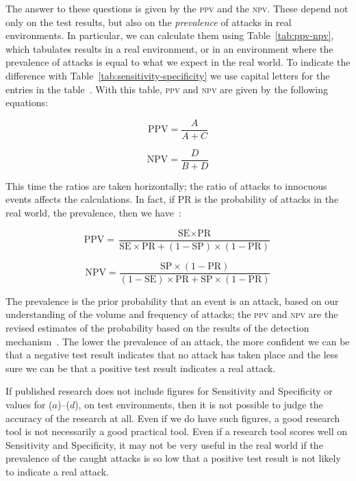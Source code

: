 \documentclass[conference]{IEEEtran}
\begin{document}
The answer to these questions is given by the \textsc{ppv} and the
\textsc{npv}. These depend not only on the test results, but also on
the \emph{prevalence} of attacks in real environments. In particular,
we can calculate them using Table~\ref{tab:ppv-npv}, which tabulates
results in a real environment, or in an environment where the
prevalence of attacks is equal to what we expect in the real world. To
indicate the difference with Table~\ref{tab:sensitivity-specificity}
we use capital letters for the entries in the table~\cite{linn2004}.
With this table, \textsc{ppv} and \textsc{npv} are given by the
following equations:

\begin{equation}
\textrm{PPV} = \frac{A}{A + C}
\end{equation}

\begin{equation}
\textrm{NPV} = \frac{D}{B + D}
\end{equation}

This time the ratios are taken horizontally; the ratio of attacks to
innocuous events affects the calculations. In fact, if PR is the
probability of attacks in the real world, the prevalence, then we
have~\cite{linn2004,altman1994}:

\begin{equation}
\textrm{PPV} = \frac{\textrm{SE}\times \textrm{PR}}{
\textrm{SE}\times \textrm{PR} + (1 - \textrm{SP})\times (1 -
\textrm{PR})}
\label{eq:ppv-se-sp}
\end{equation}

\begin{equation}
\textrm{NPV} = \frac{\textrm{SP}\times (1 - \textrm{PR})}{
(1 - \textrm{SE})\times \textrm{PR} + \textrm{SP}\times (1 -
\textrm{PR})}
\label{eq:npv-se-sp}
\end{equation}

The prevalence is the prior probability that an event is an attack,
based on our understanding of the volume and frequency of attacks; the
\textsc{ppv} and \textsc{npv} are the revised estimates of the
probability based on the results of the detection
mechanism~\cite{altman1994}. The lower the prevalence of an attack,
the more confident we can be that a negative test result indicates
that no attack has taken place and the less sure we can be that a
positive test result indicates a real attack. 

If published research does not include figures for Sensitivity and
Specificity or values for ($a$)--($d$), on test environments, then it
is not possible to judge the accuracy of the research at all. Even if
we do have such figures, a good research tool is not necessarily a
good practical tool. Even if a research tool scores well on
Sensitivity and Specificity, it may not be very useful in the real
world if the prevalence of the caught attacks is so low that a
positive test result is not likely to indicate a real attack.
\end{document}
